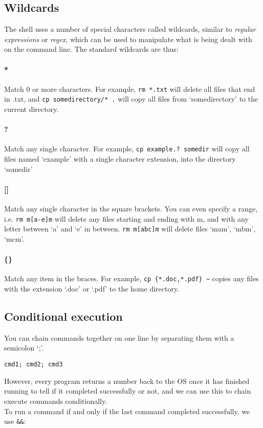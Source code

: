 \documentclass{article}
\begin{document}
\subsection{Wildcards}
The shell uses a number of special characters called wildcards, similar to \emph{regular expressions} or \emph{regex}, which can be used to manipulate what is being dealt with on the command line. The standard wildcards are thus:
\paragraph{*}
Match 0 or more characters. For example, \texttt{rm *.txt} will delete all files that end in .txt, and \texttt{cp somedirectory/* .} will copy all files from `somedirectory' to the current directory.
\paragraph{?}
Match any single character. For example, \texttt{cp example.? somedir} will copy all files named `example' with a single character extension, into the directory `somedir' 
\paragraph{[]}
Match any single character in the square brackets. You can even specify a range, i.e. \texttt{rm m[a-e]m} will delete any files starting and ending with m, and with any letter between `a' and `e' in between. \texttt{rm m[abc]m} will delete files `mam', `mbm', `mcm'.
\paragraph{\{\}}
Match any item in the braces. For example, \texttt{cp \{*.doc,*.pdf\} \textasciitilde} copies any files with the extension `.doc' or `.pdf' to the home directory.

\subsection{Conditional execution}
You can chain commands together on one line by separating them with a semicolon `;'.
\begin{verbatim}
cmd1; cmd2; cmd3
\end{verbatim}
However, every program returns a number back to the OS once it has finished running to tell if it completed successfully or not, and we can use this to chain execute commands conditionally.\\
To run a command if and only if the last command completed successfully, we use \texttt{\&\&}:
\end{document}
